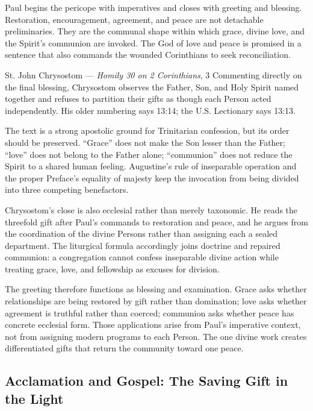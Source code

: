 \begin{deepstudy}
Paul begins the pericope with imperatives and closes with greeting and blessing. Restoration, encouragement, agreement, and peace are not detachable preliminaries. They are the communal shape within which grace, divine love, and the Spirit's communion are invoked. The God of love and peace is promised in a sentence that also commands the wounded Corinthians to seek reconciliation.

\begin{sourcecard}{St. John Chrysostom --- \emph{Homily 30 on 2 Corinthians}, 3}
Commenting directly on the final blessing, Chrysostom observes the Father, Son, and Holy Spirit named together and refuses to partition their gifts as though each Person acted independently. His older numbering says 13:14; the U.S. Lectionary says 13:13.
\end{sourcecard}

The text is a strong apostolic ground for Trinitarian confession, but its order should be preserved. “Grace” does not make the Son lesser than the Father; “love” does not belong to the Father alone; “communion” does not reduce the Spirit to a shared human feeling. Augustine's rule of inseparable operation and the proper Preface's equality of majesty keep the invocation from being divided into three competing benefactors.

Chrysostom's close is also ecclesial rather than merely taxonomic. He reads the threefold gift after Paul's commands to restoration and peace, and he argues from the coordination of the divine Persons rather than assigning each a sealed department. The liturgical formula accordingly joins doctrine and repaired communion: a congregation cannot confess inseparable divine action while treating grace, love, and fellowship as excuses for division.

The greeting therefore functions as blessing and examination. Grace asks whether relationships are being restored by gift rather than domination; love asks whether agreement is truthful rather than coerced; communion asks whether peace has concrete ecclesial form. Those applications arise from Paul's imperative context, not from assigning modern programs to each Person. The one divine work creates differentiated gifts that return the community toward one peace.

\subsection*{Acclamation and Gospel: The Saving Gift in the Light\enspace{}}


\end{deepstudy}
